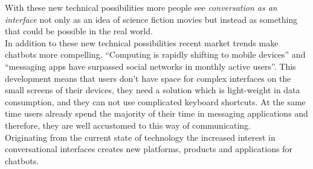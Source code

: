 With these new technical possibilities more people see \emph{conversation as an interface} not only as an idea of science fiction movies but instead as something that could be possible in the real world.
\\

In addition to these new technical possibilities recent market trends make chatbots more compelling. ``Computing is rapidly shifting to mobile devices''\cite{mobileusage} and ``messaging apps have surpassed social networks in monthly active users''\cite{convtrends}. This development means that users don't have space for complex interfaces on the small screens of their devices, they need a solution which is light-weight in data consumption, and they can not use complicated keyboard shortcuts. At the same time users already spend the majority of their time in messaging applications and therefore, they are well accustomed to this way of communicating.
\\

Originating from the current state of technology the increased interest in conversational interfaces creates new platforms, products and applications for chatbots.
